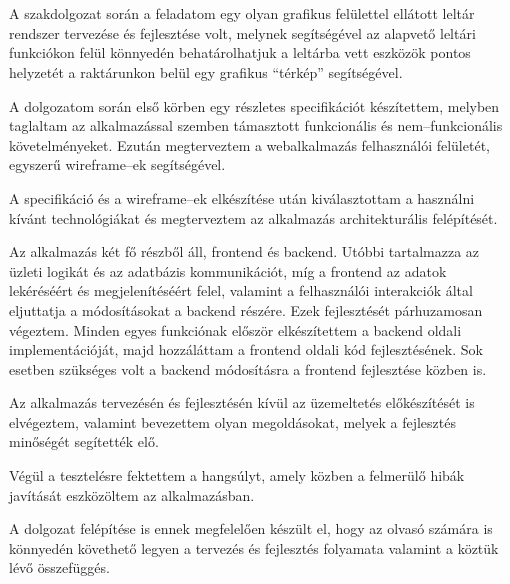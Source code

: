 \chapter{\bevezetes}
A szakdolgozat során a feladatom egy olyan grafikus felülettel ellátott leltár rendszer tervezése és fejlesztése volt, melynek segítségével az alapvető leltári funkciókon felül könnyedén behatárolhatjuk a leltárba vett eszközök pontos helyzetét a raktárunkon belül egy grafikus “térkép” segítségével.

A dolgozatom során első körben egy részletes specifikációt készítettem, melyben taglaltam az alkalmazással szemben támasztott funkcionális és nem–funkcionális követelményeket.
Ezután megterveztem a webalkalmazás felhasználói felületét, egyszerű wireframe–ek segítségével.

A specifikáció és a wireframe–ek elkészítése után kiválasztottam a használni kívánt technológiákat és megterveztem az alkalmazás architekturális felépítését.

Az alkalmazás két fő részből áll, frontend és backend. Utóbbi tartalmazza az üzleti logikát és az adatbázis kommunikációt, míg a frontend az adatok lekéréséért és megjelenítéséért felel, valamint a felhasználói interakciók által eljuttatja a módosításokat a backend részére.
Ezek fejlesztését párhuzamosan végeztem. Minden egyes funkciónak először elkészítettem a backend oldali implementációját, majd hozzáláttam a frontend oldali kód fejlesztésének. Sok esetben szükséges volt a backend módosításra a frontend fejlesztése közben is.

Az alkalmazás tervezésén és fejlesztésén kívül az üzemeltetés előkészítését is elvégeztem, valamint bevezettem olyan megoldásokat, melyek a fejlesztés minőségét segítették elő.

Végül a tesztelésre fektettem a hangsúlyt, amely közben a felmerülő hibák javítását eszközöltem az alkalmazásban.

A dolgozat felépítése is ennek megfelelően készült el, hogy az olvasó számára is könnyedén követhető legyen a tervezés és fejlesztés folyamata valamint a köztük lévő összefüggés.